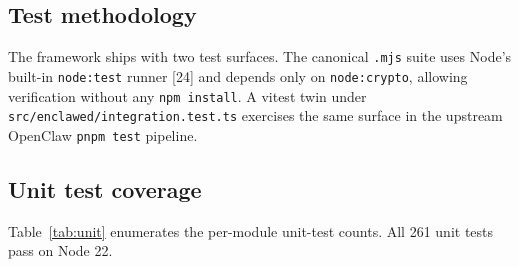 \documentclass[11pt]{article}
\begin{document}
\subsection{Test methodology}

The framework ships with two test surfaces. The canonical \texttt{.mjs}
suite uses Node's built-in \texttt{node:test} runner [24] and depends
only on \texttt{node:crypto}, allowing verification without any
\texttt{npm install}. A vitest twin under
\texttt{src/enclawed/integration.test.ts} exercises the same surface in
the upstream OpenClaw \texttt{pnpm test} pipeline.

\subsection{Unit test coverage}

Table~\ref{tab:unit} enumerates the per-module unit-test counts. All
261 unit tests pass on Node 22.
\end{document}
